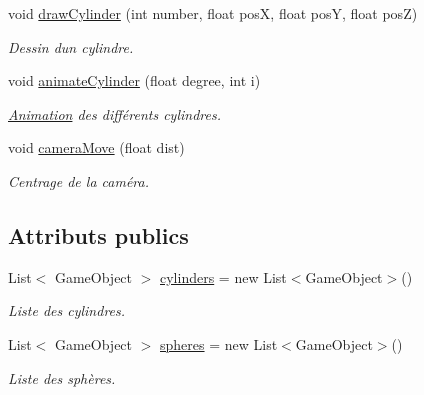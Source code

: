 \begin{DoxyCompactItemize}
void \hyperlink{class_animation_a42db90ac9b9ec3b2f3018380726f51ba}{draw\+Cylinder} (int number, float pos\+X, float pos\+Y, float pos\+Z)
\begin{DoxyCompactList}\small\item\em Dessin d\textquotesingle{}un cylindre. \end{DoxyCompactList}\item 
void \hyperlink{class_animation_ab70f71a9b180ece818d96c40cdcd7a42}{animate\+Cylinder} (float degree, int i)
\begin{DoxyCompactList}\small\item\em \hyperlink{class_animation}{Animation} des différents cylindres. \end{DoxyCompactList}\item 
void \hyperlink{class_animation_ae90a1074bf75c96180aa775e13162b6e}{camera\+Move} (float dist)
\begin{DoxyCompactList}\small\item\em Centrage de la caméra. \end{DoxyCompactList}\end{DoxyCompactItemize}
\subsection*{Attributs publics}
\begin{DoxyCompactItemize}
\item 
List$<$ Game\+Object $>$ \hyperlink{class_animation_a0d93aab7777651c0d98a8eb7c010dcf9}{cylinders} = new List$<$Game\+Object$>$()
\begin{DoxyCompactList}\small\item\em Liste des cylindres. \end{DoxyCompactList}\item 
List$<$ Game\+Object $>$ \hyperlink{class_animation_a96d77d0a4644c0a153f23c2f82ce50b9}{spheres} = new List$<$Game\+Object$>$()
\begin{DoxyCompactList}\small\item\em Liste des sphères. \end{DoxyCompactList}\end{DoxyCompactItemize}
